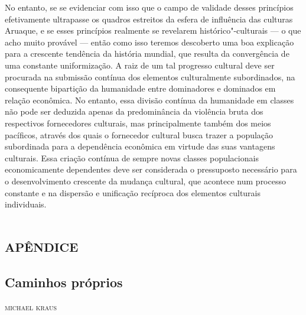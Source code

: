 No entanto, se se evidenciar com isso que o campo de validade desses
princípios efetivamente ultrapasse os quadros estreitos da esfera de
influência das culturas Aruaque, e se esses princípios realmente se
revelarem histórico"-culturais --- o que acho muito provável --- então como
isso teremos descoberto uma boa explicação para a crescente tendência da
história mundial, que resulta da convergência de uma constante
uniformização. A raiz de um tal progresso cultural deve ser procurada na
submissão contínua dos elementos culturalmente subordinados, na
consequente bipartição da humanidade entre dominadores e dominados em
relação econômica. No entanto, essa divisão contínua da humanidade em
classes não pode ser deduzida apenas da predominância da violência bruta
dos respectivos fornecedores culturais, mas principalmente também dos
meios pacíficos, através dos quais o fornecedor cultural busca trazer a
população subordinada para a dependência econômica em virtude das suas
vantagens culturais. Essa criação contínua de sempre novas classes
populacionais economicamente dependentes deve ser considerada o
pressuposto necessário para o desenvolvimento crescente da mudança
cultural, que acontece num processo constante e na dispersão e
unificação recíproca dos elementos culturais individuais.

\part{\textsc{apêndice}}

\chapter[Caminhos próprios: As pesquisas de Max Schmidt no contexto da antropologia contemporânea de língua alemã, \emph{por Michael Kraus}]{Caminhos próprios }

\begin{flushright}
\textsc{michael kraus}\medskip
\end{flushright}

